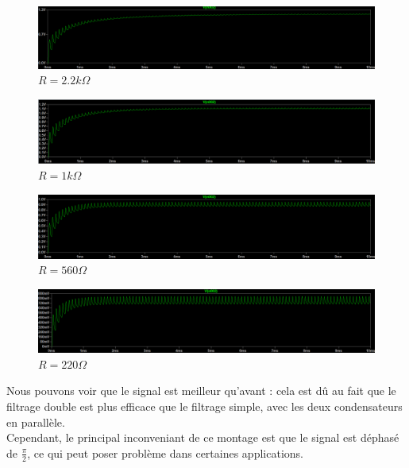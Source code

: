 \begin{figure}[H]
    \begin{center}
    \includegraphics[scale=0.25]{images/LTSPICE/d.png}
    \caption{$R=2.2k\Omega$}
    \end{center}
\end{figure}

\begin{figure}[H]
    \begin{center}
    \includegraphics[scale=0.25]{images/LTSPICE/e.png}
    \caption{$R=1k\Omega$}
    \end{center}
\end{figure}

\begin{figure}[H]
    \begin{center}
    \includegraphics[scale=0.25]{images/LTSPICE/f.png}
    \caption{$R=560\Omega$}
    \end{center}
\end{figure}

\begin{figure}[H]
    \begin{center}
    \includegraphics[scale=0.25]{images/LTSPICE/g.png}
    \caption{$R=220\Omega$}
    \end{center}
\end{figure}

Nous pouvons voir que le signal est meilleur qu'avant : cela est dû au fait que le filtrage double est plus efficace que le filtrage simple, avec les deux condensateurs en parallèle.
\\
Cependant, le principal inconveniant de ce montage est que le signal est déphasé de $\frac{\pi}{2}$, ce qui peut poser problème dans certaines applications.
